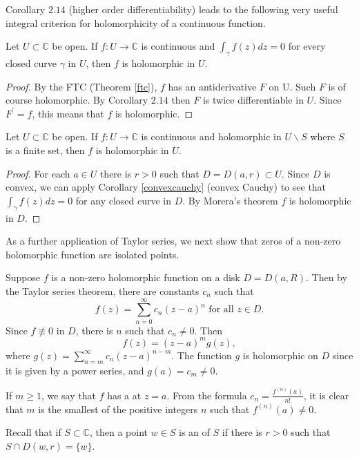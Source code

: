 \documentclass[egregdoesnotlikesansseriftitles,a4paper]{scrartcl}
\begin{document}
Corollary $2.14$ (higher order differentiability) leads to the following very useful integral criterion for holomorphicity of a continuous function.

\begin{theorem}\label{morera}
     Let $U \subset \mathbb{C}$ be open. If $f: U \rightarrow \mathbb{C}$ is continuous and $\int_{\gamma} f(z) d z=0$ for every closed curve $\gamma$ in $U$, then $f$ is holomorphic in $U$.
\end{theorem}
\begin{proof}
     By the FTC (Theorem \ref{ftc}), $f$ has an antiderivative $F$ on U. Such $F$ is of course holomorphic. By Corollary $2.14$ then $F$ is twice differentiable in $U$. Since $F^{\prime}=f$, this means that $f$ is holomorphic.
\end{proof}
\begin{corollary}
     Let $U \subset \mathbb{C}$ be open. If $f: U \rightarrow \mathbb{C}$ is continuous and holomorphic in $U \backslash S$ where $S$ is a finite set, then $f$ is holomorphic in $U$.
\end{corollary}
\begin{proof}
     For each $a \in U$ there is $r>0$ such that $D=D(a, r) \subset U$. Since $D$ is convex, we can apply Corollary \ref{convexcauchy} (convex Cauchy) to see that $\int_{\gamma} f(z) d z=0$ for any closed curve in $D$. By Morera's theorem $f$ is holomorphic in $D$.
\end{proof}
As a further application of Taylor series, we next show that zeros of a non-zero holomorphic function are isolated points.

Suppose $f$ is a non-zero holomorphic function on a disk $D=D(a, R)$. Then by the Taylor series theorem, there are constants $c_{n}$ such that \[
     f(z)=\sum_{n=0}^{\infty} c_{n}(z-a)^{n} \text{ for all } z \in D
.\] 
Since $f \not \equiv 0$ in $D$, there is $n$ such that $c_{n} \neq 0 .$ Then \[
     f(z)=(z-a)^{m} g(z)
,\] 
where $g(z)=\sum_{n=m}^{\infty} c_{n}(z-a)^{n-m}$. The function $g$ is holomorphic on $D$ since it is given by a power series, and $g(a)=c_{m} \neq 0$.

\begin{notation}
     If $m \geq 1$, we say that $f$ has a  at $z=a$. From the formula $c_{n}=\frac{f^{(n)}(a)}{n !}$, it is clear that $m$ is the smallest of the positive integers $n$ such that $f^{(n)}(a) \neq 0$.
\end{notation}
Recall that if $S \subset \mathbb{C}$, then a point $w \in S$ is an  of $S$ if there is $r>0$ such that $S \cap D(w, r)=\{w\}$.
\end{document}
